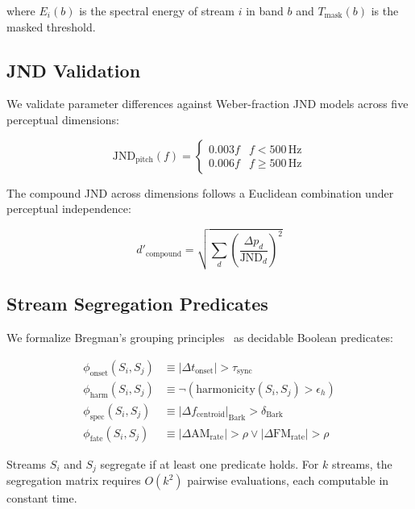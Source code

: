 \documentclass[sigchi, nonacm]{acmart}
\begin{document}
where $E_i(b)$ is the spectral energy of stream $i$ in band $b$ and $T_\mathrm{mask}(b)$ is the masked threshold.

\subsection{JND Validation}
\label{sec:jnd}

We validate parameter differences against Weber-fraction JND models across five perceptual dimensions:

\begin{equation}
\mathrm{JND}_\mathrm{pitch}(f) = \begin{cases}
    0.003 f & f < 500\,\mathrm{Hz} \\
    0.006 f & f \geq 500\,\mathrm{Hz}
\end{cases}
\end{equation}

The compound JND across dimensions follows a Euclidean combination under perceptual independence:

\begin{equation}
d'_\mathrm{compound} = \sqrt{\sum_d \left(\frac{\Delta p_d}{\mathrm{JND}_d}\right)^2}
\end{equation}

\subsection{Stream Segregation Predicates}
\label{sec:segregation}

We formalize Bregman's grouping principles~\cite{bregman1990auditory} as decidable Boolean predicates:

\begin{align}
\phi_\mathrm{onset}(S_i, S_j) &\equiv |\Delta t_\mathrm{onset}| > \tau_\mathrm{sync} \label{eq:onset} \\
\phi_\mathrm{harm}(S_i, S_j) &\equiv \neg(\mathrm{harmonicity}(S_i, S_j) > \epsilon_h) \label{eq:harm} \\
\phi_\mathrm{spec}(S_i, S_j) &\equiv |\Delta f_\mathrm{centroid}|_\mathrm{Bark} > \delta_\mathrm{Bark} \label{eq:spec} \\
\phi_\mathrm{fate}(S_i, S_j) &\equiv |\Delta\mathrm{AM}_\mathrm{rate}| > \rho \vee |\Delta\mathrm{FM}_\mathrm{rate}| > \rho \label{eq:fate}
\end{align}

Streams $S_i$ and $S_j$ segregate if at least one predicate holds. For $k$ streams, the segregation matrix requires $O(k^2)$ pairwise evaluations, each computable in constant time.
\end{document}
